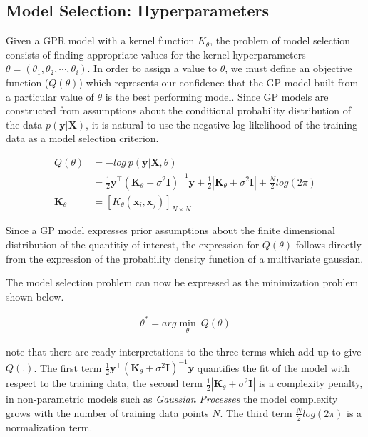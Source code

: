 \documentclass{article}
\begin{document}
\subsection{Model Selection: Hyperparameters}

Given a GPR model with a kernel function $K_\theta$, the problem of
model selection consists of finding appropriate values for the kernel
hyperparameters $\theta = \left(\theta_1, \theta_2, \cdots,
  \theta_i\right)$. In order to assign a value to $\theta$, we must
define an objective function ($Q(\theta)$) which represents our
confidence that the GP model built from a particular value of $\theta$
is the best performing model. Since GP models are constructed from
assumptions about the conditional probability distribution of the data
$p(\mathbf{y}|\mathbf{X})$, it is natural to use the negative
log-likelihood of the training data as a model selection criterion. 

\begin{align*}
  Q(\theta) & = - log \ p(\mathbf{y}|\mathbf{X}, \theta) \\
            & = \frac{1}{2} \mathbf{y}^\intercal (\mathbf{K}_\theta + \sigma^{2} \mathbf{I})^{-1} \mathbf{y} + \frac{1}{2}|\mathbf{K}_\theta + \sigma^{2} \mathbf{I}| + \frac{N}{2}log(2\pi) \\
  \mathbf{K}_\theta & = [K_{\theta}(\mathbf{x}_i, \mathbf{x}_j)]_{N \times N}
\end{align*}

Since a GP model expresses prior assumptions about the finite
dimensional distribution of the quantitiy of interest, the expression
for $Q(\theta)$ follows directly from the expression of the
probability density function of a multivariate gaussian.

The model selection problem can now be expressed as the minimization
problem shown below.

\begin{align*}
  \theta^* = arg\min_{\theta} \ Q(\theta)
\end{align*}

\citet{Rasmussen:2005:GPM:1162254} note that there are ready
interpretations to the three terms which add up to give $Q(.)$. The
first term $\frac{1}{2} \mathbf{y}^\intercal (\mathbf{K}_\theta +
\sigma^{2} \mathbf{I})^{-1} \mathbf{y}$ quantifies the fit of the
model with respect to the training data, the second term
$\frac{1}{2}|\mathbf{K}_\theta + \sigma^{2} \mathbf{I}|$ is a
complexity penalty, in non-parametric models such as \emph{Gaussian
  Processes} the model complexity grows with the number of training
data points $N$. The third term $\frac{N}{2}log(2\pi)$ is a
normalization term.
\end{document}
